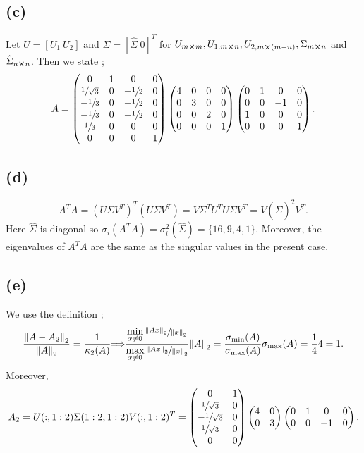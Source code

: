 \documentclass[12pt]{article}
\let\oldimplies\implies
\renewcommand*{\implies}{
	\hspace{-0.05cm}\resizebox{.95\width}{\height}{$\oldimplies$}\hspace{-0.05cm}
}
\begin{document}
		\subsection*{(c)}
			Let $U = [U_1 \ U_2]$ and $\Sigma = [\hat{\Sigma} \ 0]^{T}$ for $U_{m \cross m} , U_{1, m\cross n}, U_{2, m \cross (m-n)}, \Sigma_{m\cross n}$ and $\hat{\Sigma}_{ n \cross n}$. Then we state ; 
			$$ A = \begin{pmatrix}
				0 & 1 & 0 & 0 \\
				\sfrac{1}{\sqrt{3}} & 0 & -\sfrac{1}{2} & 0 \\
				-\sfrac{1}{3} & 0 & - \sfrac{1}{2} & 0 \\
				-\sfrac{1}{3} &0 & - \sfrac{1}{2} & 0 \\
				\sfrac{1}{3} & 0 & 0 & 0 \\
				0 & 0 & 0 & 1 
			\end{pmatrix}\begin{pmatrix}
				4 & 0 & 0 & 0 \\0 & 3 & 0 & 0 \\0 & 0 & 2 & 0 \\0 & 0 & 0 & 1
			\end{pmatrix} \begin{pmatrix}
				0 & 1 & 0 & 0 \\
				 0 & 0 & -1 & 0 \\ 1 & 0 & 0 &0 \\0 & 0 & 0 & 1
			\end{pmatrix}.$$
		\subsection*{(d)}
			$$ A^{T}A = (U \Sigma V^{T})^{T} (U \Sigma V^{T}) = V \Sigma^{T} U^{T} U \Sigma V^{T} = V(\hat{\Sigma})^{2} V^{T}.$$
			Here $\hat{\Sigma}$ is diagonal so $\sigma_i (A^{T}A) = \sigma_i^{2}(\hat{\Sigma}) = \{16,9,4,1\}$. Moreover, the eigenvalues of $A^{T}A$ are the same as the singular values in the present case.		
		\subsection*{(e)}
			We use the definition ; 
			$$ \frac{\norm{A - A_2}_2}{\norm{A}_2} = \frac{1}{\kappa_2(A)} \implies \frac{\min\limits_{x \neq 0} \sfrac{\norm{Ax}_2}{\norm{x}_2}}{\max\limits_{x \neq 0} \sfrac{\norm{Ax}_2}{\norm{x}_2}}\norm{A}_2 = \frac{\sigma_{\min}(A)}{\sigma_{\max}(A)}\sigma_{\max}(A) =\frac{1}{4} 4= 1.$$
			Moreover, 
			$$ A_{2} = U(:, 1 : 2)\Sigma(1:2, 1:2)V(:,1:2)^{T} = \begin{pmatrix}
				0 & 1  \\ \sfrac{1}{\sqrt{3}} & 0 \\ - \sfrac{1}{\sqrt{3}} & 0\\ \sfrac{1}{\sqrt{3}} & 0 \\ 0 & 0 
			\end{pmatrix} \begin{pmatrix}
				4 & 0 \\ 0 & 3
			\end{pmatrix} \begin{pmatrix}
				0 & 1 & 0 & 0 \\ 0 & 0 & -1 & 0
			\end{pmatrix}.$$
\end{document}

